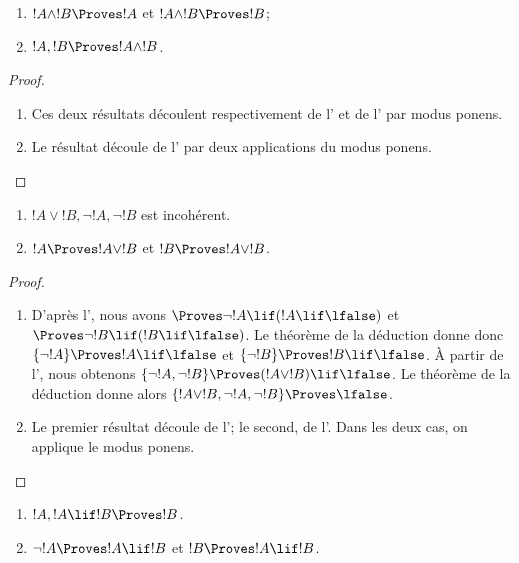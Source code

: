\documentclass[11pt,a4paper,openany]{memoir}
\begin{document}
\begin{prop}
\begin{enumerate}
\item {}
  $!A \land !B \Proves !A$ et $!A \land !B \Proves !B$;
\item {}
  $!A, !B \Proves !A \land !B$.
\end{enumerate}
\end{prop}

\begin{proof}
\begin{enumerate}
\item Ces deux résultats découlent respectivement de
  l' et de l' par modus ponens.
\item Le résultat découle de l' par deux
  applications du modus ponens.
\end{enumerate}
\end{proof}

\begin{prop}
\begin{enumerate}
\item $!A \lor !B, \lnot !A, \lnot !B$ est incohérent.
\item $!A \Proves !A \lor !B$ et $!B \Proves !A \lor !B$.
\end{enumerate}
\end{prop}

\begin{proof}
\begin{enumerate}
\item D'après l', nous avons
  $\Proves \lnot !A \lif (!A \lif \lfalse)$ et
  $\Proves \lnot !B \lif (!B \lif \lfalse)$. Le théorème de la
  déduction donne donc
  $\{\lnot !A\} \Proves !A \lif \lfalse$ et
  $\{\lnot !B\} \Proves !B \lif \lfalse$. À partir de
  l', nous obtenons
  $\{\lnot !A, \lnot !B\} \Proves (!A \lor !B) \lif \lfalse$.
  Le théorème de la déduction donne alors
  $\{!A \lor !B, \lnot !A, \lnot !B\} \Proves \lfalse$.
\item Le premier résultat découle de l'; le second,
  de l'. Dans les deux cas, on applique le modus
  ponens.
\end{enumerate}
\end{proof}

\begin{prop}
\begin{enumerate}
\item {}
  $!A, !A \lif !B \Proves !B$.
\item {}
  $\lnot !A \Proves !A \lif !B$ et $!B \Proves !A \lif !B$.
\end{enumerate}
\end{prop}
\end{document}
